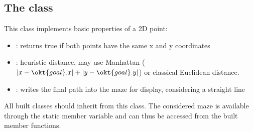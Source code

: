 \documentclass{ecnreport}
\begin{document}
\subsection{The  class}\label{ptClass}

This class implements basic properties of a 2D point:

\begin{itemize}
 \item {}: returns true if both points have the same x and y coordinates
 \item {}: heuristic distance, may use Manhattan
 ($|x-\okt{goal}.x| + |y-\okt{goal}.y|$) or classical Euclidean distance.
 \item {}: writes the final path into the maze for display, considering a straight line
\end{itemize}
All built classes should inherit from this class. The considered maze is available through the static member variable  and can thus
be accessed from the built member functions.
\end{document}
